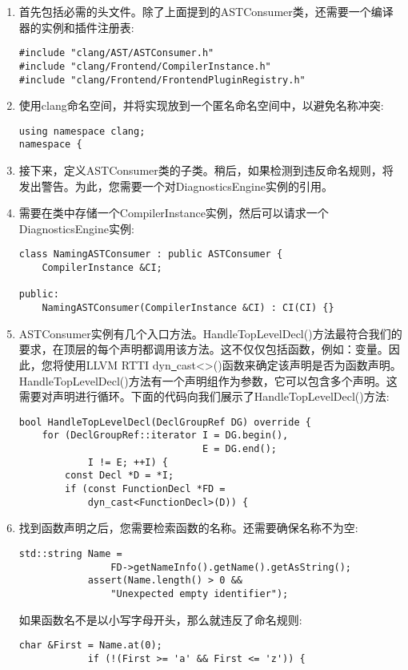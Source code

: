\begin{enumerate}
\item 首先包括必需的头文件。除了上面提到的ASTConsumer类，还需要一个编译器的实例和插件注册表:
\begin{lstlisting}[caption={}]
#include "clang/AST/ASTConsumer.h"
#include "clang/Frontend/CompilerInstance.h"
#include "clang/Frontend/FrontendPluginRegistry.h"
\end{lstlisting}

\item 使用clang命名空间，并将实现放到一个匿名命名空间中，以避免名称冲突:
\begin{lstlisting}[caption={}]
using namespace clang;
namespace {
\end{lstlisting}

\item 接下来，定义ASTConsumer类的子类。稍后，如果检测到违反命名规则，将发出警告。为此，您需要一个对DiagnosticsEngine实例的引用。

\item 需要在类中存储一个CompilerInstance实例，然后可以请求一个DiagnosticsEngine实例:
\begin{lstlisting}[caption={}]
class NamingASTConsumer : public ASTConsumer {
	CompilerInstance &CI;
	
public:
	NamingASTConsumer(CompilerInstance &CI) : CI(CI) {}
\end{lstlisting}

\item ASTConsumer实例有几个入口方法。HandleTopLevelDecl()方法最符合我们的要求，在顶层的每个声明都调用该方法。这不仅仅包括函数，例如：变量。因此，您将使用LLVM RTTI dyn\underline{~}cast<>()函数来确定该声明是否为函数声明。HandleTopLevelDecl()方法有一个声明组作为参数，它可以包含多个声明。这需要对声明进行循环。下面的代码向我们展示了HandleTop\allowbreak LevelDecl()方法:
\begin{lstlisting}[caption={}]
bool HandleTopLevelDecl(DeclGroupRef DG) override {
	for (DeclGroupRef::iterator I = DG.begin(),
								E = DG.end();
			I != E; ++I) {
		const Decl *D = *I;
		if (const FunctionDecl *FD =
			dyn_cast<FunctionDecl>(D)) {
\end{lstlisting}

\item 找到函数声明之后，您需要检索函数的名称。还需要确保名称不为空:
\begin{lstlisting}[caption={}]
			std::string Name =
				FD->getNameInfo().getName().getAsString();
			assert(Name.length() > 0 &&
				"Unexpected empty identifier");
\end{lstlisting}
如果函数名不是以小写字母开头，那么就违反了命名规则:
\begin{lstlisting}[caption={}]
			char &First = Name.at(0);
			if (!(First >= 'a' && First <= 'z')) {
\end{lstlisting}


\end{enumerate}
